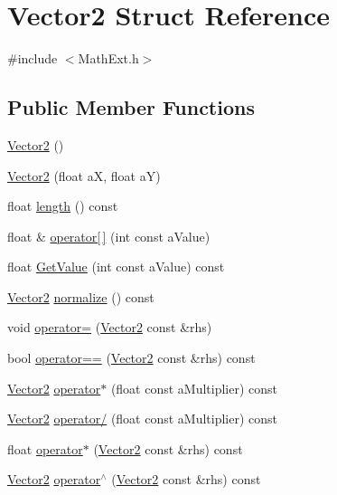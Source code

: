\hypertarget{structVector2}{}\section{Vector2 Struct Reference}
\label{structVector2}


{\ttfamily \#include $<$Math\+Ext.\+h$>$}

\subsection*{Public Member Functions}
\begin{DoxyCompactItemize}
\item 
\hyperlink{structVector2_a22104d1809be26a419ef1f959e3761bf}{Vector2} ()
\item 
\hyperlink{structVector2_a5ca9b33926bea2d537d27626988ddd28}{Vector2} (float aX, float aY)
\item 
float \hyperlink{structVector2_adc8e4837830c1a4839503e1bf9f0e5b6}{length} () const 
\item 
float \& \hyperlink{structVector2_ac3ff249cea581cfe26c57e77db0d9c8f}{operator\mbox{[}$\,$\mbox{]}} (int const a\+Value)
\item 
float \hyperlink{structVector2_a185eddd4762ec2063c4c47092e34188a}{Get\+Value} (int const a\+Value) const 
\item 
\hyperlink{structVector2}{Vector2} \hyperlink{structVector2_a2c3a317411d3b9f01f8135a428235772}{normalize} () const 
\item 
void \hyperlink{structVector2_a4e96fb2907573bbc41a720c0753c0a9c}{operator=} (\hyperlink{structVector2}{Vector2} const \&rhs)
\item 
bool \hyperlink{structVector2_a3afdc2d923d1d3814ca00456537966b2}{operator==} (\hyperlink{structVector2}{Vector2} const \&rhs) const 
\item 
\hyperlink{structVector2}{Vector2} \hyperlink{structVector2_a75e95826c87c34c84ca98069c73f4208}{operator$\ast$} (float const a\+Multiplier) const 
\item 
\hyperlink{structVector2}{Vector2} \hyperlink{structVector2_a93e47de409ad9fd875d322b2083ba677}{operator/} (float const a\+Multiplier) const 
\item 
float \hyperlink{structVector2_a475eb680cea9cc63206a9d473d3211ef}{operator$\ast$} (\hyperlink{structVector2}{Vector2} const \&rhs) const 
\item 
\hyperlink{structVector2}{Vector2} \hyperlink{structVector2_adbe20f63e6ec704a1df16685a6f7c32e}{operator$^\wedge$} (\hyperlink{structVector2}{Vector2} const \&rhs) const 

\end{DoxyCompactItemize}
